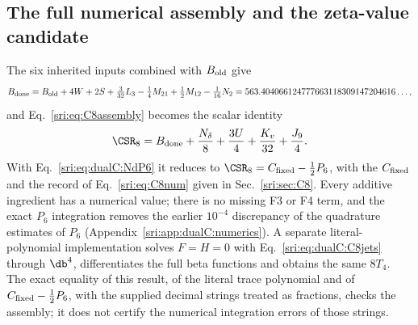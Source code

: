 \subsection{The full numerical assembly and the zeta-value candidate}\label{sri:app:dualC:C8assembly}
The six inherited inputs combined with $B_{\rm old}$ give
\begin{equation}
 B_{\rm done}=B_{\rm old}+4W+2S+\tfrac3{32}L_3-\tfrac14M_{21}+\tfrac12M_{12}-\tfrac1{16}N_2
 =563.404066124777663118309147204616\ldots,
\end{equation}
and Eq.~\eqref{sri:eq:C8assembly} becomes the scalar identity
\begin{equation}
 \CSR_8=B_{\rm done}+\frac{N_\delta}{8}+\frac{3U}{4}+\frac{K_v}{32}+\frac{J_9}{4}.
\end{equation}
With Eq.~\eqref{sri:eq:dualC:NdP6} it reduces to $\CSR_8=C_{\rm fixed}-\frac12P_6$, with the $C_{\rm fixed}$ and the
record of Eq.~\eqref{sri:eq:C8num} given in Sec.~\ref{sri:sec:C8}. Every additive ingredient has a numerical value; there is
no missing F3 or F4 term, and the exact $P_6$ integration removes the earlier $10^{-4}$ discrepancy of the
quadrature estimates of $P_6$ (Appendix~\ref{sri:app:dualC:numerics}). A separate literal-polynomial implementation solves
$F=H=0$ with Eq.~\eqref{sri:eq:dualC:C8jets} through $\db^4$, differentiates the full beta functions and obtains the same
$8T_4$. The exact equality of this result, of the literal trace polynomial and of $C_{\rm fixed}-\frac12P_6$, with the
supplied decimal strings treated as fractions, checks the assembly; it does not certify the numerical integration
errors of those strings.

